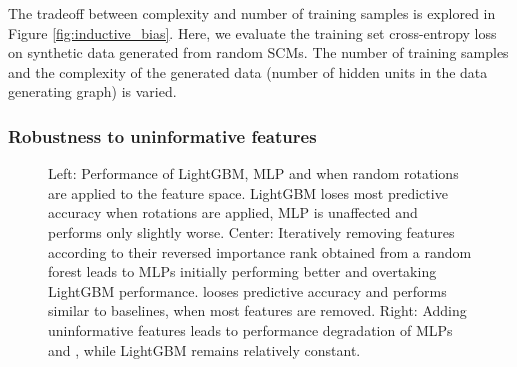 \documentclass{article}
\begin{document}
The tradeoff between complexity and number of training samples is explored in Figure \ref{fig:inductive_bias}. Here, we evaluate the training set cross-entropy loss on synthetic data generated from random SCMs. The number of training samples and the complexity of the generated data (number of hidden units in the data generating graph) is varied. 

\subsubsection{Robustness to uninformative features}
\label{sec:app:robustness_uninformative}
\begin{figure}[h]
     \centering
     \hspace*{-1cm}
     \begin{subfigure}[t]{0.31\textwidth}
         \centering
            
            \label{fig:inductive_bias_graphs:rotate}
            \vspace*{0.5cm}
     \end{subfigure}
     \hspace*{0.5cm}
     \begin{subfigure}[t]{0.31\textwidth}
         \centering
            
            \label{fig:inductive_bias_graphs:remove}
     \end{subfigure}
     \hspace*{0.5cm}
     \begin{subfigure}[t]{0.31\textwidth}
         \centering
            
            \label{fig:inductive_bias_graphs:add}
     \end{subfigure}
     \vspace{-.5cm}
     \caption{Left: Performance of LightGBM, MLP and \methodname{} when random rotations are applied to the feature space. LightGBM loses most predictive accuracy when rotations are applied, MLP is unaffected and \methodname{} performs only slightly worse. Center: Iteratively removing features according to their  reversed importance rank obtained from a random forest leads to MLPs initially performing better and overtaking LightGBM performance. \methodname{} looses predictive accuracy and performs similar to baselines, when most features are removed. Right: Adding uninformative features leads to performance degradation of MLPs and \methodname{}, while LightGBM remains relatively constant.}
     \label{fig:inductive_bias_graphs}
\end{figure}
\end{document}
